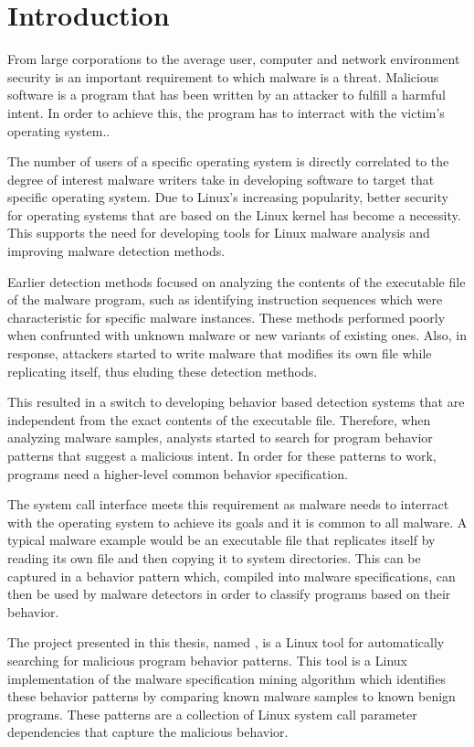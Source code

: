 \chapter{Introduction}
\label{chapter:intro}

From large corporations to the average user, computer and network environment security is an important requirement to which malware is a threat. Malicious software is a program that has been written by an attacker to fulfill a harmful intent. In order to achieve this, the program has to interract with the victim's operating system..

The number of users of a specific operating system is directly correlated to the degree of interest malware writers take in developing software to target that specific operating system. Due to Linux's increasing popularity, better security for operating systems that are based on the Linux kernel has become a necessity. This supports the need for developing tools for Linux malware analysis and improving malware detection methods.

Earlier detection methods focused on analyzing the contents of the executable file of the malware program, such as identifying instruction sequences which were characteristic for specific malware instances. These methods performed poorly when confrunted with unknown malware or new variants of existing ones. Also, in response, attackers started to write malware that modifies its own file while replicating itself, thus eluding these detection methods.

This resulted in a switch to developing behavior based detection systems that are independent from the exact contents of the executable file. Therefore, when analyzing malware samples, analysts started to search for program behavior patterns that suggest a malicious intent. In order for these patterns to work, programs need a higher-level common behavior specification.

The system call interface meets this requirement as malware needs to interract with the operating system to achieve its goals and it is common to all malware. A typical malware example would be an executable file that replicates itself by reading its own file and then copying it to system directories. This can be captured in a behavior pattern which, compiled into malware specifications, can then be used by malware detectors in order to classify programs based on their behavior.

The project presented in this thesis, named \project, is a Linux tool for automatically searching for malicious program behavior patterns. This tool is a Linux implementation of the malware specification mining algorithm which identifies these behavior patterns by comparing known malware samples to known benign programs. These patterns are a collection of Linux system call parameter dependencies that capture the malicious behavior.

